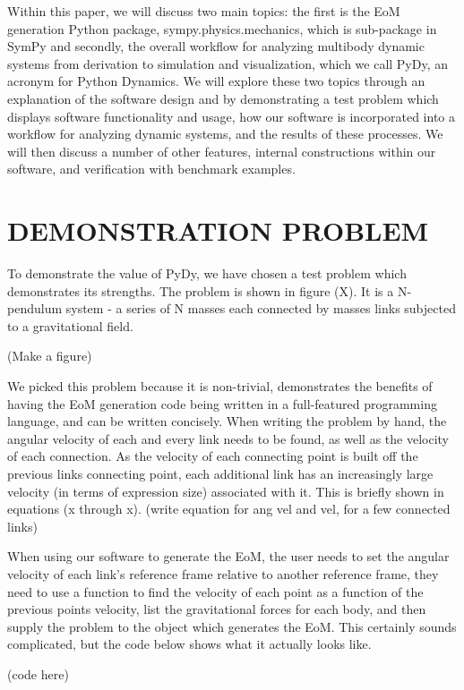 \documentclass[twocolumn,10pt]{asme2e}
\begin{document}
Within this paper, we will discuss two main topics: the first is the EoM
generation Python package, sympy.physics.mechanics, which is sub-package in
SymPy and secondly, the overall workflow for analyzing multibody dynamic
systems from derivation to simulation and visualization, which we call PyDy, an
acronym for Python Dynamics. We will explore these two topics through an
explanation of the software design and by demonstrating a test problem which
displays software functionality and usage, how our software is incorporated
into a workflow for analyzing dynamic systems, and the results of these
processes. We will then discuss a number of other features, internal
constructions within our software, and verification with benchmark examples.
\section*{DEMONSTRATION PROBLEM}
To demonstrate the value of PyDy, we have chosen a test problem which
demonstrates its strengths.
The problem is shown in figure (X).
It is a N-pendulum system - a series of N masses each connected by masses links
subjected to a gravitational field.

(Make a figure)

We picked this problem because it is non-trivial, demonstrates the benefits of
having the EoM generation code being written in a full-featured programming
language, and can be written concisely.
When writing the problem by hand, the angular velocity of each and every link
needs to be found, as well as the velocity of each connection.
As the velocity of each connecting point is built off the previous links
connecting point, each additional link has an increasingly large velocity (in
terms of expression size) associated with it.
This is briefly shown in equations (x through x).
(write equation for ang vel and vel, for a few connected links)

When using our software to generate the EoM, the user needs to set the angular
velocity of each link’s reference frame relative to another reference frame,
they need to use a function to find the velocity of each point as a function of
the previous points velocity, list the gravitational forces for each body, and
then supply the problem to the object which generates the EoM.
This certainly sounds complicated, but the code below shows what it actually
looks like.

(code here)
\end{document}
